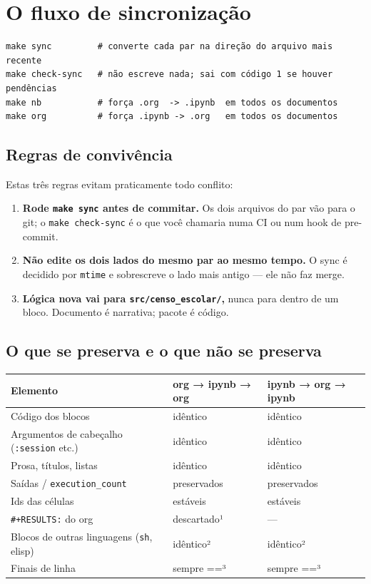 \documentclass[11pt]{article}
\begin{document}
\section*{O fluxo de sincronização}
\label{sec:org8a2889b}

\begin{verbatim}
make sync         # converte cada par na direção do arquivo mais recente
make check-sync   # não escreve nada; sai com código 1 se houver pendências
make nb           # força .org  -> .ipynb  em todos os documentos
make org          # força .ipynb -> .org   em todos os documentos
\end{verbatim}
\subsection*{Regras de convivência}
\label{sec:org8aa798b}

Estas três regras evitam praticamente todo conflito:

\begin{enumerate}
\item \textbf{Rode \texttt{make sync} antes de commitar.} Os dois arquivos do par vão para o
git; o \texttt{make check-sync} é o que você chamaria numa CI ou num hook de
pre-commit.
\item \textbf{Não edite os dois lados do mesmo par ao mesmo tempo.} O sync é decidido
por \texttt{mtime} e sobrescreve o lado mais antigo — ele não faz merge.
\item \textbf{Lógica nova vai para \texttt{src/censo\_escolar/},} nunca para dentro de um bloco.
Documento é narrativa; pacote é código.
\end{enumerate}
\subsection*{O que se preserva e o que não se preserva}
\label{sec:org416aa47}

\begin{center}
\begin{tabular}{lll}
Elemento & org → ipynb → org & ipynb → org → ipynb\\
\hline
Código dos blocos & idêntico & idêntico\\
Argumentos de cabeçalho (\texttt{:session} etc.) & idêntico & idêntico\\
Prosa, títulos, listas & idêntico & idêntico\\
Saídas / \texttt{execution\_count} & preservados & preservados\\
Ids das células & estáveis & estáveis\\
\texttt{\#+RESULTS:} do org & descartado¹ & —\\
Blocos de outras linguagens (\texttt{sh}, elisp) & idêntico² & idêntico²\\
Finais de linha & sempre =\n=³ & sempre =\n=³\\
\end{tabular}
\end{center}
\end{document}
